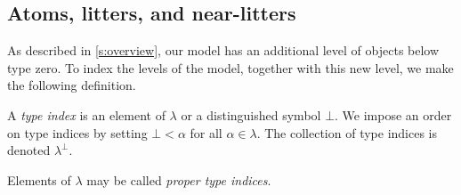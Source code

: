 \subsection{Atoms, litters, and near-litters}

As described in \cref{s:overview}, our model has an additional level of objects below type zero.
To index the levels of the model, together with this new level, we make the following definition.
\begin{definition}
    A \emph{type index} is an element of \( \lambda \) or a distinguished symbol \( \bot \).
    We impose an order on type indices by setting \( \bot < \alpha \) for all \( \alpha \in \lambda \).
    The collection of type indices is denoted \( \lambda^\bot \).
\end{definition}
Elements of \( \lambda \) may be called \emph{proper type indices}.

